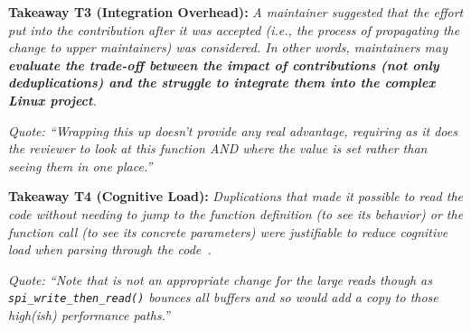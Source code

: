 \documentclass[10pt,conference]{IEEEtran}
\newenvironment{takeaway}[1]{%
  \begin{tcolorbox}
  \textbf{#1:} \itshape}{\end{tcolorbox}}
\begin{document}
\begin{takeaway}{Takeaway T3 (Integration Overhead)}
  A maintainer suggested that the effort put into the contribution after it was
  accepted (i.e., the process of propagating the change to upper maintainers)
  was considered. In other words, maintainers may \textbf{evaluate the
  trade-off between the impact of contributions (not only deduplications) and
  the struggle to integrate them into the complex Linux project}.
\end{takeaway}

\noindent
\begin{footnotesize}
\textit{
    Quote: ``Wrapping this up doesn't provide any real advantage, requiring as
    it does the reviewer to look at this function AND where the value is set
    rather than seeing them in one place.''
  }
\end{footnotesize}

%
\begin{takeaway}{Takeaway T4 (Cognitive Load)}
  Duplications that made it possible to read the code without needing to jump
  to the function definition (to see its behavior) or the function call (to see
  its concrete parameters) were justifiable to reduce cognitive load when
  parsing through the code~\cite{skylines-cognitive-load}.
\end{takeaway}

\noindent
\begin{footnotesize}
\textit{
    Quote: ``Note that is not an appropriate change for the large reads though
    as \texttt{spi\_write\_then\_read()} bounces all buffers and so would add a
    copy to those high(ish) performance paths.''
  }
\end{footnotesize}
\end{document}
